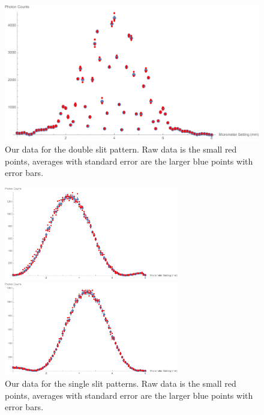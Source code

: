 \documentclass[prb,preprint]{revtex4-1}
\begin{document}
\begin{figure}[h!]
\centering
\includegraphics[width=6in]{double_slit_plot.pdf}
\caption{Our data for the double slit pattern.  Raw data is the small red points, averages with standard error are the larger blue points with error bars. }
\label{double_slit_plot}
\end{figure}

\begin{figure}[h!]
\centering
\begin{minipage}[b]{0.45\linewidth}
	\includegraphics[width=3in]{far_slit_plot.pdf}
\end{minipage}
\quad
\begin{minipage}[b]{0.45\linewidth}
	\includegraphics[width=3in]{near_slit_plot.pdf}
\end{minipage}
\caption{Our data for the single slit patterns. Raw data is the small red points, averages with standard error are the larger blue points with error bars. }
\label{single_slits_plot}
\end{figure}
\end{document}
